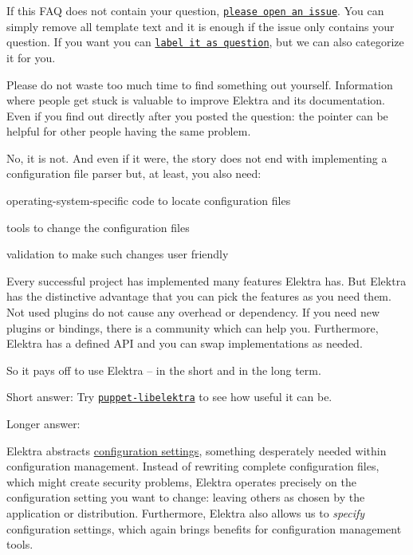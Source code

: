 If this F\+AQ does not contain your question, \href{https://git.libelektra.org/issues}{\tt please open an issue}. You can simply remove all template text and it is enough if the issue only contains your question. If you want you can \href{https://git.libelektra.org/issues/labels/question}{\tt label it as question}, but we can also categorize it for you.

Please do not waste too much time to find something out yourself. Information where people get stuck is valuable to improve Elektra and its documentation. Even if you find out directly after you posted the question\+: the pointer can be helpful for other people having the same problem.

No, it is not. And even if it were, the story does not end with implementing a configuration file parser but, at least, you also need\+:


\begin{DoxyItemize}
\item operating-\/system-\/specific code to locate configuration files
\item tools to change the configuration files
\item validation to make such changes user friendly
\end{DoxyItemize}

Every successful project has implemented many features Elektra has. But Elektra has the distinctive advantage that you can pick the features as you need them. Not used plugins do not cause any overhead or dependency. If you need new plugins or bindings, there is a community which can help you. Furthermore, Elektra has a defined A\+PI and you can swap implementations as needed.

So it pays off to use Elektra -- in the short and in the long term.

Short answer\+: Try \href{https://puppet.libelektra.org}{\tt puppet-\/libelektra} to see how useful it can be.

Longer answer\+:

Elektra abstracts \hyperlink{doc_help_elektra-glossary_md}{configuration settings}, something desperately needed within configuration management. Instead of rewriting complete configuration files, which might create security problems, Elektra operates precisely on the configuration setting you want to change\+: leaving others as chosen by the application or distribution. Furthermore, Elektra also allows us to {\itshape specify} configuration settings, which again brings benefits for configuration management tools.

